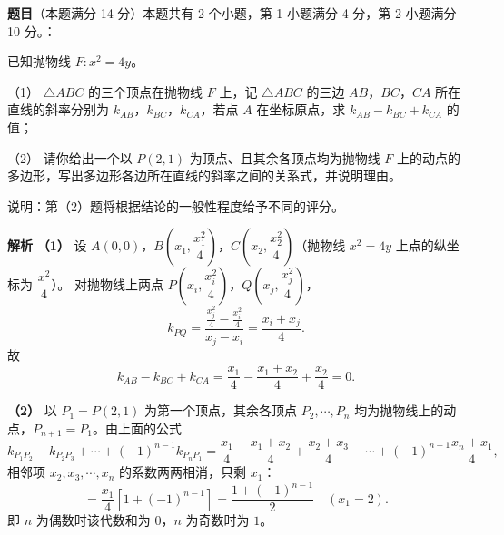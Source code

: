 \begin{answer}

\textbf{题目}（本题满分 14 分）本题共有 2 个小题，第 1 小题满分 4 分，第 2 小题满分 10 分。：

已知抛物线 $F:x^2=4y$。

（1） $\triangle ABC$ 的三个顶点在抛物线 $F$ 上，记 $\triangle ABC$ 的三边 $AB$，$BC$，$CA$ 所在直线的斜率分别为 $k_{AB}$，$k_{BC}$，$k_{CA}$，若点 $A$ 在坐标原点，求 $k_{AB}-k_{BC}+k_{CA}$ 的值；

（2） 请你给出一个以 $P(2,1)$ 为顶点、且其余各顶点均为抛物线 $F$ 上的动点的多边形，写出多边形各边所在直线的斜率之间的关系式，并说明理由。

说明：第（2）题将根据结论的一般性程度给予不同的评分。

\textbf{解析}
\textbf{（1）} 设 $A(0,0)$，$B\left(x_1,\dfrac{x_1^2}4\right)$，$C\left(x_2,\dfrac{x_2^2}4\right)$（抛物线 $x^2=4y$ 上点的纵坐标为 $\dfrac{x^2}4$）。
对抛物线上两点 $P\left(x_i,\dfrac{x_i^2}4\right)$，$Q\left(x_j,\dfrac{x_j^2}4\right)$，
\nopagebreak[4]
\[k_{PQ}=\frac{\frac{x_j^2}4-\frac{x_i^2}4}{x_j-x_i}=\frac{x_i+x_j}4.\]
故
\nopagebreak[4]
\[k_{AB}-k_{BC}+k_{CA}=\frac{x_1}4-\frac{x_1+x_2}4+\frac{x_2}4=0.\]

\textbf{（2）} 以 $P_1=P(2,1)$ 为第一个顶点，其余各顶点 $P_2,\cdots,P_n$ 均为抛物线上的动点，$P_{n+1}=P_1$。由上面的公式
\nopagebreak[4]
\[k_{P_1P_2}-k_{P_2P_3}+\cdots+(-1)^{n-1}k_{P_nP_1}=\frac{x_1}4-\frac{x_1+x_2}4+\frac{x_2+x_3}4-\cdots+(-1)^{n-1}\frac{x_n+x_1}4,\]
相邻项 $x_2,x_3,\cdots,x_n$ 的系数两两相消，只剩 $x_1$：
\nopagebreak[4]
\[=\frac{x_1}4\left[1+(-1)^{n-1}\right]=\frac{1+(-1)^{n-1}}2\quad(x_1=2).\]
即 $n$ 为偶数时该代数和为 $0$，$n$ 为奇数时为 $1$。



\end{answer}
